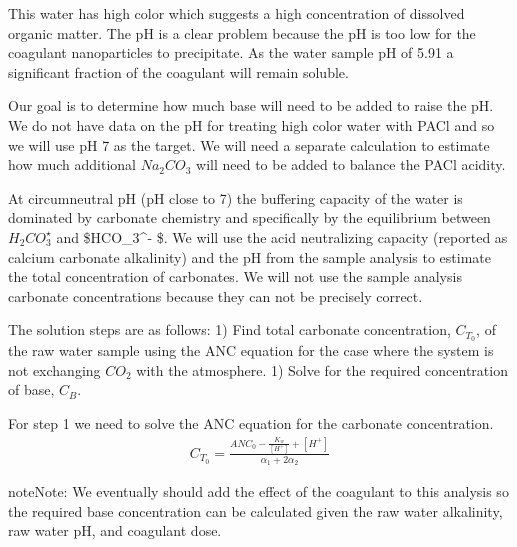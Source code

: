 \documentclass[letterpaper,10pt,english]{sphinxmanual}
\begin{document}
This water has high color which suggests a high concentration of dissolved organic matter. The pH is a clear problem because the pH is too low for the coagulant nanoparticles to precipitate. As the water sample pH of 5.91 a significant fraction of the coagulant will remain soluble.

Our goal is to determine how much base will need to be added to raise the pH. We do not have data on the  pH for treating high color water with PACl and so we will use pH 7 as the target. We will need a separate calculation to estimate how much additional \(Na_2CO_3\) will need to be added to balance the PACl acidity.

At circumneutral pH (pH close to 7) the buffering capacity of the water is dominated by carbonate chemistry and specifically by the equilibrium between \({H_2}CO_3^{\star}\) and \$HCO\_3\textasciicircum{}- \$. We will use the acid neutralizing capacity (reported as calcium carbonate alkalinity) and the pH from the sample analysis to estimate the total concentration of carbonates. We will not use the sample analysis carbonate concentrations because they can not be precisely correct.

The solution steps are as follows: 1) Find total carbonate concentration, \(C_{T_0}\), of the raw water sample using the ANC equation for the case where the system is not exchanging \(CO_2\) with the atmosphere. 1) Solve for the required concentration of base, \(C_B\).

For step 1 we need to solve the ANC equation for the carbonate concentration.
\begin{equation}\label{equation:Rapid_Mix/RM_Examples:Rapid_Mix/RM_Examples:21}
\begin{split}C_{T_0} = \frac{ANC_0  - \frac{{{K_w}}}{{\left[ {{H^ + }} \right]}} + \left[ {{H^ + }} \right]}{\alpha_1 + 2\alpha_2}\end{split}
\end{equation}
\begin{sphinxadmonition}{note}{Note:}
We eventually should add the effect of the coagulant to this analysis so the required base concentration can be calculated given the raw water alkalinity, raw water pH, and coagulant dose.
\end{sphinxadmonition}
\end{document}
